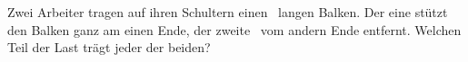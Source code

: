 Zwei Arbeiter tragen auf ihren Schultern einen \LBaO\ langen Balken. Der eine stützt den Balken ganz am einen Ende, der zweite \dBaO\ vom andern Ende entfernt. Welchen Teil der Last trägt jeder der beiden?
